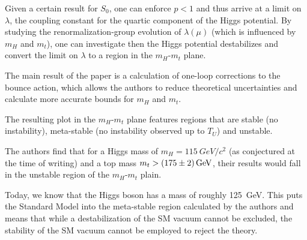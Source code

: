 Given a certain result for $S_0$, one can enforce $p < 1$ and thus arrive at a limit on $\lambda$, the coupling constant for the quartic component of the Higgs potential.
By studying the renormalization-group evolution of $\lambda(\mu)$ (which is influenced by $m_H$ and $m_t$), one can investigate then the Higgs potential destabilizes and convert the limit on $λ$ to a region in the $m_H$-$m_t$ plane.

The main result of the paper is a calculation of one-loop corrections to the bounce action, which allows the authors to reduce theoretical uncertainties and calculate more accurate bounds for $m_H$ and $m_t$.

The resulting plot in the $m_H$-$m_t$ plane features regions that are stable (no instability), meta-stable (no instability observed up to $T_U$) and unstable.

The authors find that for a Higgs mass of $m_H = \SI{115}{GeV/\textit{c}^2}$ (as conjectured at the time of writing) and a top mass $m_t > \SI{175\pm2}{GeV}$, their results would fall in the unstable region of the $m_H$-$m_t$ plain.

Today, we know that the Higgs boson has a mass of roughly \SI{125}{GeV}.
This puts the Standard Model into the meta-stable region calculated by the authors and means that while a destabilization of the SM vacuum cannot be excluded, the stability of the SM vacuum cannot be employed to reject the theory.

